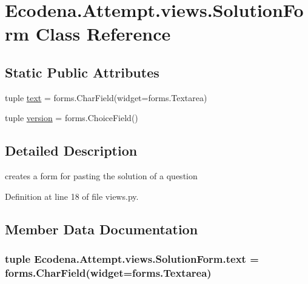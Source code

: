 \hypertarget{class_ecodena_1_1_attempt_1_1views_1_1_solution_form}{
\section{Ecodena.Attempt.views.SolutionForm Class Reference}
\label{df/d81/class_ecodena_1_1_attempt_1_1views_1_1_solution_form}
}
\subsection*{Static Public Attributes}
\begin{DoxyCompactItemize}
\item 
tuple \hyperlink{class_ecodena_1_1_attempt_1_1views_1_1_solution_form_a468dd4b8939f889b625d93015bbb2e4f}{text} = forms.CharField(widget=forms.Textarea)
\item 
tuple \hyperlink{class_ecodena_1_1_attempt_1_1views_1_1_solution_form_a77e5671273cfb3207fd55e2b3defd321}{version} = forms.ChoiceField()
\end{DoxyCompactItemize}


\subsection{Detailed Description}
\begin{DoxyVerb}creates a form for pasting the solution of a question \end{DoxyVerb}
 

Definition at line 18 of file views.py.



\subsection{Member Data Documentation}
\hypertarget{class_ecodena_1_1_attempt_1_1views_1_1_solution_form_a468dd4b8939f889b625d93015bbb2e4f}{
\subsubsection[{text}]{\setlength{\rightskip}{0pt plus 5cm}tuple {\bf Ecodena.Attempt.views.SolutionForm.text} = forms.CharField(widget=forms.Textarea)}}
\label{df/d81/class_ecodena_1_1_attempt_1_1views_1_1_solution_form_a468dd4b8939f889b625d93015bbb2e4f}


